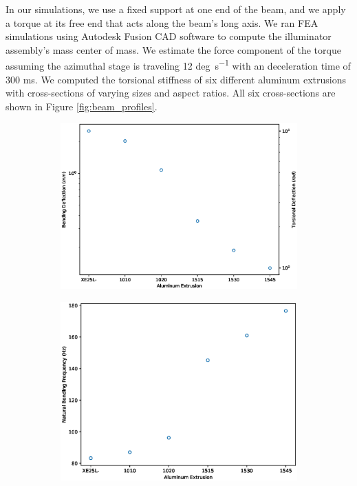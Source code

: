 In our simulations, we use a fixed support at one end of the beam, and we apply a torque at its free end that acts along the beam's long axis. We ran FEA simulations using Autodesk Fusion CAD software to compute the illuminator assembly's mass center of mass. We estimate the force component of the torque assuming the azimuthal stage is traveling 12 \si{deg\per\second} with an deceleration time of 300 \si{\ms}. We computed the torsional stiffness of six different aluminum extrusions with cross-sections of varying sizes and aspect ratios. All six cross-sections are shown in Figure \ref{fig:beam_profiles}.
%
\begin{figure}
    \centering
    \begin{subfigure}{0.49\textwidth}
        \centering
        \includegraphics[trim={0 0 0 0}, clip, width=\textwidth]{../figures/deflection.eps}
        \caption{}
        \label{fig:structural_deflection}
    \end{subfigure}
    \begin{subfigure}{0.49\textwidth}
        \centering
        \includegraphics[trim={0 0 0 0}, clip, width=\textwidth]{../figures/frequency.eps}

\end{subfigure}
\end{figure}
